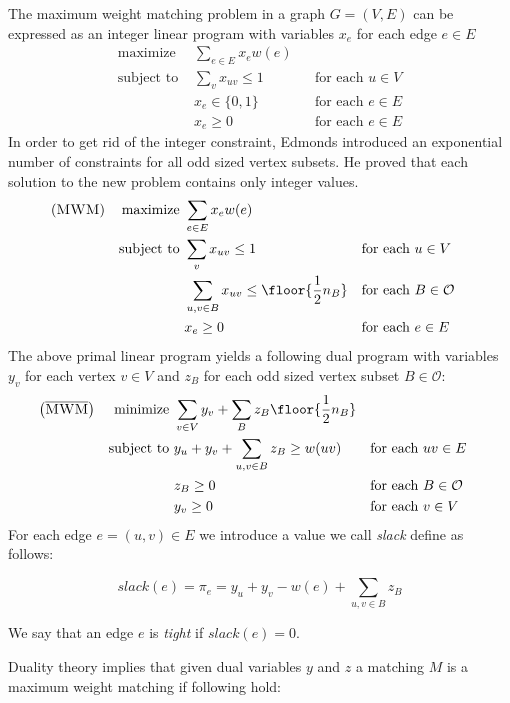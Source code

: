 The maximum weight matching problem in a graph $G=(V,E)$ can be expressed as an integer linear program with variables $x_e$ for each edge $e \in E$
\begin{align*}
\text{maximize }   & \sum_{e \in E} x_e w(e) \\
\text{subject to } & \sum_v x_{uv} \leq 1 &&\text{for each $u \in V$} \\
                   & x_e \in\{0, 1\}      &&\text{for each $e \in E$} \\
                   & x_e \geq 0           &&\text{for each $e \in E$}    
\end{align*}
In order to get rid of the integer constraint, Edmonds introduced an exponential number of constraints for all odd sized vertex subsets. He proved that each solution to the new problem contains only integer values.
\begin{align*}
\left(\textsc{MWM}\right) && \text{maximize }   & \sum_{e \in E} x_e w(e)\\
&& \text{subject to } & \sum_v x_{uv} \leq 1 &&\text{for each $u \in V$} \\
                   &&& \sum_{u, v \in B} x_{uv} \leq \floor{\frac{1}{2}n_B} &&\text{for each $B \in \mathcal{O}$} \\
                   &&& x_e \geq 0           &&\text{for each $e \in E$}
\end{align*}
The above primal linear program yields a following dual program with variables $y_v$ for each vertex $v \in V$ and $z_B$ for each odd sized vertex subset $B \in \mathcal{O}$:
\begin{align*}
\left(\overline{\textsc{MWM}}\right) && \text{minimize }   & \sum_{v\in V}y_v + \sum_{B} z_B \floor{\frac{1}{2}n_B} \\
&& \text{subject to } & y_u + y_v + \sum_{u, v \in B} z_B \geq w(uv) &&\text{for each $uv \in E$} \\
                   &&& z_B \geq 0          &&\text{for each $B \in \mathcal{O}$} \\
                   &&& y_v \geq 0          &&\text{for each $v \in V$}
\end{align*}
For each edge $e = (u, v) \in E$ we introduce a value we call \textit{slack} define as follows:

\[slack(e) = \pi_e = y_u + y_v - w(e) + \sum_{u, v \in B} z_B\]

We say that an edge $e$ is \textit{tight} if $slack(e) = 0$.

Duality theory implies that given dual variables $y$ and $z$ a matching $M$ is a maximum weight matching if following hold:

